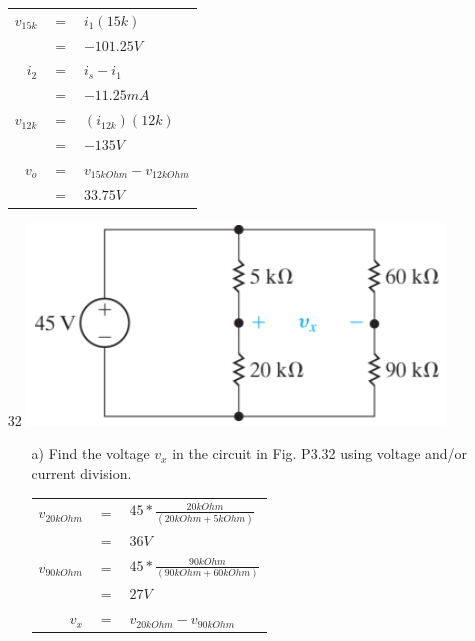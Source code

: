 \documentclass[a4paper]{article}
\begin{document}
\begin{itemize}
\begin{tabular}{rcl}
	      	$v_{15k}$ & $=$ & $i_{1}(15k)$                                          \\
	      	          & $=$ & $-101.25 V$                                           \\
	      	$i_{2}$   & $=$ & $i_{s} - i_{1}$                                       \\
	      	          & $=$ & $-11.25 mA$                                           \\
	      	$v_{12k}$ & $=$ & $(i_{12k})(12k)$                                      \\
	      	          & $=$ & $-135 V$                                              \\
	      	$v_{o}$   & $=$ & $v_{15 kOhm} - v_{12 kOhm}$                           \\
	      	          & $=$ & $33.75 V$                                             \\
	      \end{tabular} 
	\item[32] \includegraphics[scale=0.5]{3-32.png} \\ 
	      \begin{itemize}
	      	\item[a)] Find the voltage $v_{x}$ in the circuit in Fig. P3.32 using voltage and/or current division. \\
	      	      \begin{tabular}{rcl}
	      	      	$v_{20 kOhm}$ & $=$ & $45 * \frac{20 kOhm}{(20 kOhm + 5 kOhm)}$ \\
	      	      	             & $=$ & $36 V$                    \\
	      	      	$v_{90 kOhm}$     & $=$ & $45 * \frac{90 kOhm}{(90 kOhm + 60 kOhm)}$ \\
	      	      	             & $=$ & $27 V$                     \\
	      	      	$v_{x}$      & $=$ & $v_{20 kOhm} - v_{90 kOhm}$           \\

\end{tabular}
\end{itemize}
\end{itemize}
\end{document}
